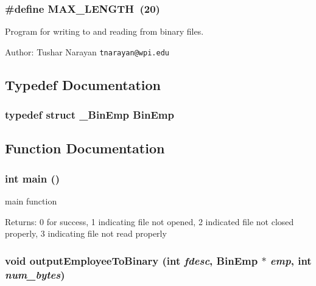 \subsubsection{\setlength{\rightskip}{0pt plus 5cm}\#define MAX\_\-LENGTH~(20)}\label{binaryarrays_8c_9dea1f0bdad8046729180b16db0a8d13}


Program for writing to and reading from binary files. \begin{Desc}
\item[Author:]Tushar Narayan \tt{tnarayan@wpi.edu} \end{Desc}


\subsection{Typedef Documentation}
\subsubsection{\setlength{\rightskip}{0pt plus 5cm}typedef struct \bf{\_\-Bin\-Emp} \bf{Bin\-Emp}}\label{binaryarrays_8c_c3b8faf74095b0194633e40cd4dee394}




\subsection{Function Documentation}
\subsubsection{\setlength{\rightskip}{0pt plus 5cm}int main ()}\label{binaryarrays_8c_446c6b9a1a4dbab517fbb760870458a3}


main function \begin{Desc}
\item[Returns:]0 for success, 1 indicating file not opened, 2 indicated file not closed properly, 3 indicating file not read properly \end{Desc}
\subsubsection{\setlength{\rightskip}{0pt plus 5cm}void output\-Employee\-To\-Binary (int {\em fdesc}, \bf{Bin\-Emp} $\ast$ {\em emp}, int {\em num\_\-bytes})}\label{binaryarrays_8c_4d667eb4e1e165230a3902da8b0ff3c9}


